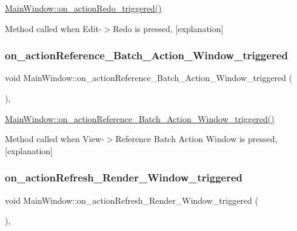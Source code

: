 \hyperlink{class_main_window_a386390413f5b36190ba30ab8d4c653d0}{Main\+Window\+::on\+\_\+action\+Redo\+\_\+triggered()} 

Method called when Edit-\/$>$Redo is pressed, \mbox{[}explanation\mbox{]} \mbox{\label{class_main_window_a162cfcb7e13f7d350c9246e2a084eb6b}} 
\subsubsection{\texorpdfstring{on\+\_\+action\+Reference\+\_\+\+Batch\+\_\+\+Action\+\_\+\+Window\+\_\+triggered}{on\_actionReference\_Batch\_Action\_Window\_triggered}}
{\footnotesize\ttfamily void Main\+Window\+::on\+\_\+action\+Reference\+\_\+\+Batch\+\_\+\+Action\+\_\+\+Window\+\_\+triggered (\begin{DoxyParamCaption}{ }\end{DoxyParamCaption})\hspace{0.3cm}{\ttfamily [private]}, {\ttfamily [slot]}}



\hyperlink{class_main_window_a162cfcb7e13f7d350c9246e2a084eb6b}{Main\+Window\+::on\+\_\+action\+Reference\+\_\+\+Batch\+\_\+\+Action\+\_\+\+Window\+\_\+triggered()} 

Method called when View-\/$>$Reference Batch Action Window is pressed, \mbox{[}explanation\mbox{]} \mbox{\label{class_main_window_a52c7776d665150af7b2393ab3e72b8d6}} 
\subsubsection{\texorpdfstring{on\+\_\+action\+Refresh\+\_\+\+Render\+\_\+\+Window\+\_\+triggered}{on\_actionRefresh\_Render\_Window\_triggered}}
{\footnotesize\ttfamily void Main\+Window\+::on\+\_\+action\+Refresh\+\_\+\+Render\+\_\+\+Window\+\_\+triggered (\begin{DoxyParamCaption}{ }\end{DoxyParamCaption})\hspace{0.3cm}{\ttfamily [private]}, {\ttfamily [slot]}}



